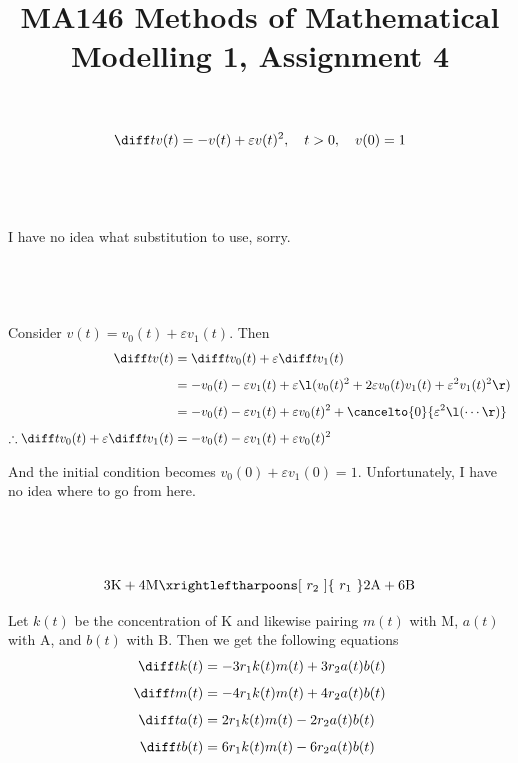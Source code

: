 \documentclass[a4paper]{article}
\title{MA146 Methods of Mathematical Modelling 1, Assignment 4}
\begin{document}
\maketitle

\setlength{\parindent}{0em}
\setlength{\parskip}{1em}


$$\diff t v(t) = -v(t) + \varepsilon v(t)^2, \quad t > 0, \quad v(0) = 1$$

\subsection{~}

I have no idea what substitution to use, sorry.

\subsection{~}

Consider $v(t) = v_0(t) + \varepsilon v_1(t)$. Then \begin{align*}
	\diff t v(t) &= \diff t v_0(t) + \varepsilon \diff t v_1(t)\\[1ex]
				 &= -v_0(t) - \varepsilon v_1(t) + \varepsilon \l(v_0(t)^2 + 2 \varepsilon v_0(t) v_1(t) + \varepsilon^2 v_1(t)^2 \r)\\[1ex]
				 &= -v_0(t) - \varepsilon v_1(t) + \varepsilon v_0(t)^2 + \cancelto{0}{\varepsilon^2 \l(\cdots\r)}\\[1ex]
	\therefore \diff t v_0(t) + \varepsilon \diff t v_1(t) &= -v_0(t) - \varepsilon v_1(t) + \varepsilon v_0(t)^2
\end{align*}

And the initial condition becomes $v_0(0) + \varepsilon v_1(0) = 1$. Unfortunately, I have no idea where to go from here.


\subsection{~}

$$3\text{K} + 4\text{M} \xrightleftharpoons[\ r_2\ ]{\ r_1\ } 2\text{A} + 6\text{B}$$

Let $k(t)$ be the concentration of K and likewise pairing $m(t)$ with M, $a(t)$ with A, and $b(t)$ with B. Then we get the following equations \begin{align*}
	\diff t k(t) &= -3 r_1 k(t) m(t) + 3 r_2 a(t) b(t)\\[1ex]
	\diff t m(t) &= -4 r_1 k(t) m(t) + 4 r_2 a(t) b(t)\\[1ex]
	\diff t a(t) &= 2 r_1 k(t) m(t) - 2 r_2 a(t) b(t)\\[1ex]
	\diff t b(t) &= 6 r_1 k(t) m(t) - 6 r_2 a(t) b(t)
\end{align*}
\end{document}
